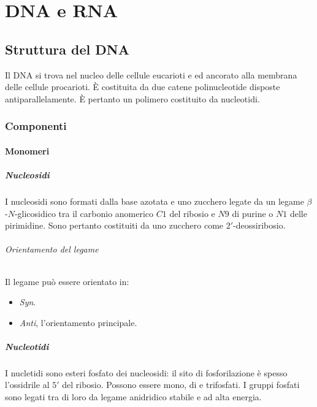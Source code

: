 \chapter{DNA e RNA}
\section{Struttura del DNA}
Il DNA si trova nel nucleo delle cellule eucarioti e ed ancorato alla membrana delle cellule procarioti.
\`E costituita da due catene polinucleotide disposte antiparallelamente. 
\`E pertanto un polimero costituito da nucleotidi.

	\subsection{Componenti}

		\subsubsection{Monomeri}

			\paragraph{Nucleosidi}
			I nucleosidi sono formati dalla base azotata e uno zucchero legate da un legame $\beta$-$N$-glicosidico tra il carbonio anomerico $C1$ del ribosio e $N9$ di purine o $N1$ delle pirimidine.
			Sono pertanto costituiti da uno zucchero come $2'$-deossiribosio.

				\subparagraph{Orientamento del legame}
				Il legame pu\`o essere orientato in:
				\begin{multicols}{2}
					\begin{itemize}
						\item \emph{Syn}.
						\item \emph{Anti}, l'orientamento principale.
					\end{itemize}
				\end{multicols}

			\paragraph{Nucleotidi}
			I nucletidi sono esteri fosfato dei nucleosidi: il sito di fosforilazione \`e spesso l'ossidrile al $5'$ del ribosio.
			Possono essere mono, di e trifosfati.
			I gruppi fosfati sono legati tra di loro da legame anidridico stabile e ad alta energia.
			

